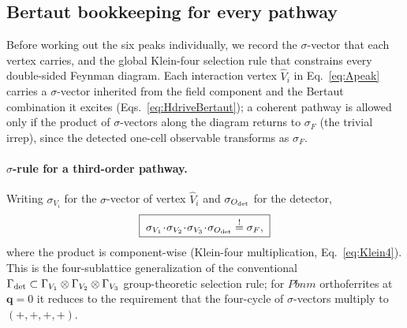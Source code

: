 \documentclass[reprint,amsmath,amssymb,aps,prb,longbibliography]{revtex4-2}
\begin{document}
\subsection{Bertaut bookkeeping for every pathway}
\label{sec:LiouvilleBertaut}

Before working out the six peaks individually, we record the
$\sigma$-vector that each vertex carries, and the global Klein-four
selection rule that constrains every double-sided Feynman diagram.
Each interaction vertex $\hat V_i$ in Eq.~\eqref{eq:Apeak} carries a
$\sigma$-vector inherited from the field component and the Bertaut
combination it excites (Eqs.~\eqref{eq:HdriveBertaut}); a coherent
pathway is allowed only if the product of $\sigma$-vectors along the
diagram returns to $\sigma_F$ (the trivial irrep), since the
detected one-cell observable transforms as $\sigma_F$.

\paragraph{$\sigma$-rule for a third-order pathway.}
Writing $\sigma_{V_i}$ for the $\sigma$-vector of vertex $\hat V_i$
and $\sigma_{O_{\rm det}}$ for the detector,
\begin{equation}
\boxed{\;\sigma_{V_1}\!\cdot\!\sigma_{V_2}\!\cdot\!\sigma_{V_3}\!\cdot\!\sigma_{O_{\rm det}}
\stackrel{!}{=}\sigma_F,\;}
\label{eq:sigmaRule}
\end{equation}
where the product is component-wise (Klein-four multiplication, Eq.~\eqref{eq:Klein4}).
This is the four-sublattice generalization of the conventional
$\Gamma_{\rm det}\subset\Gamma_{V_1}\otimes\Gamma_{V_2}\otimes\Gamma_{V_3}$
group-theoretic selection rule; for $Pbnm$ orthoferrites at $\mathbf q=0$
it reduces to the requirement that the four-cycle of $\sigma$-vectors
multiply to $(+,+,+,+)$.
\end{document}
